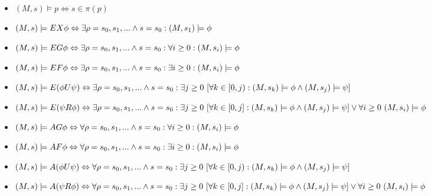 \documentclass{article}
\theoremstyle{plain}
\theoremstyle{definition}
\begin{document}
\begin{multicols}{2}
\begin{itemize}
\item $(M, s) \models p \Leftrightarrow s \in \pi(p)$
\item $(M, s) \models EX\phi \Leftrightarrow\\ \exists \rho = s_0, s_1, ... \land s = s_0: (M, s_1) \models \phi$
\item $(M, s) \models EG\phi \Leftrightarrow\\ \exists \rho = s_0, s_1, ... \land s = s_0: \forall i \geq 0: (M, s_i) \models \phi$
\item $(M, s) \models EF\phi \Leftrightarrow\\ \exists \rho = s_0, s_1, ... \land s = s_0: \exists i \geq 0: (M, s_i) \models \phi$
\item $(M, s) \models E(\phi U\psi) \Leftrightarrow\\ \exists \rho = s_0, s_1, ... \land s = s_0:\\ \exists j \geq 0\  \lbrack\forall k \in [0, j): (M, s_k) \models \phi \land (M, s_j) \models \psi\rbrack$
\item $(M, s) \models E(\psi R\phi) \Leftrightarrow\\ \exists \rho = s_0, s_1, ... \land s = s_0:\\ \exists j \geq 0\  \lbrack\forall k \in [0, j]: (M, s_k) \models \phi \land (M, s_j) \models \psi\rbrack\\ \lor \forall i \geq 0\ (M, s_i) \models \phi$
\item $(M, s) \models AG\phi \Leftrightarrow\\ \forall \rho = s_0, s_1, ... \land s = s_0: \forall i \geq 0: (M, s_i) \models \phi$
\item $(M, s) \models AF\phi \Leftrightarrow\\ \forall \rho = s_0, s_1, ... \land s = s_0: \exists i \geq 0: (M, s_i) \models \phi$
\item $(M, s) \models A(\phi U\psi) \Leftrightarrow\\ \forall \rho = s_0, s_1, ... \land s = s_0:\\ \exists j \geq 0\  \lbrack\forall k \in [0, j): (M, s_k) \models \phi \land (M, s_j) \models \psi\rbrack$
\item $(M, s) \models A(\psi R\phi) \Leftrightarrow\\ \forall \rho = s_0, s_1, ... \land s = s_0:\\ \exists j \geq 0\  \lbrack\forall k \in [0, j]: (M, s_k) \models \phi \land (M, s_j) \models \psi\rbrack\\ \lor \forall i \geq 0\ (M, s_i) \models \phi$
\end{itemize}


\end{multicols}
\end{document}
